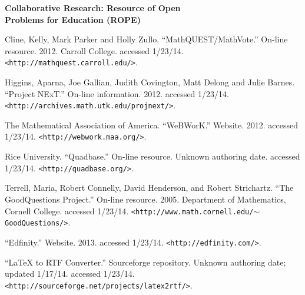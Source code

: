 \documentclass[11pt]{article}
\begin{document}
\begin{center}
{\Large \textbf{Collaborative Research: Resource of Open\\
Problems for Education (ROPE)}}
\end{center}

\begin{thebibliography}{9}

 Cline, Kelly, Mark Parker and Holly Zullo.
    ``MathQUEST/MathVote.'' On-line resource. 2012.  Carroll College.
    accessed 1/23/14.
    \texttt{<http://mathquest.carroll.edu/>}.

 Higgins, Aparna, Joe Gallian, Judith Covington,
    Matt Delong and Julie Barnes.  ``Project NExT.''  On-line information.  2012.
    accessed 1/23/14.
    \texttt{<http://archives.math.utk.edu/projnext/>}.

 The Mathematical Association of America.  ``WeBWorK.''
    Website.  2012.  accessed 1/23/14.
    \texttt{<http://webwork.maa.org/>}.

 Rice University.  ``Quadbase.''  On-line resource.
    Unknown authoring date.  accessed 1/23/14.
    \texttt{<http://quadbase.org/>}.

 Terrell, Maria, Robert Connelly, David Henderson,
    and Robert Strichartz.  ``The GoodQuestions Project.''  On-line
    resource.  2005. Department of Mathematics, Cornell College.  accessed
    1/23/14.
    \texttt{<http://www.math.cornell.edu/$\sim$GoodQuestions/>}.

 ``Edfinity.''  Website.  2013.  accessed 1/23/14.
    \texttt{<http://edfinity.com/>}.

 ``LaTeX to RTF Converter.''  Sourceforge repository.
    Unknown authoring date;
    updated 1/17/14.  accessed 1/23/14.
    \texttt{<http://sourceforge.net/projects/latex2rtf/>}.

\end{thebibliography}
\end{document}
